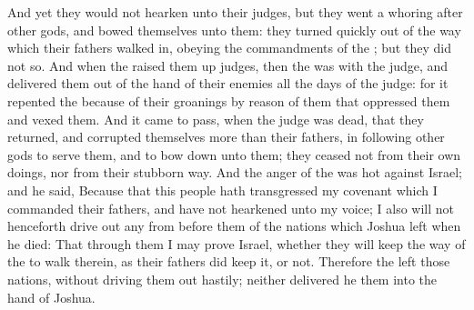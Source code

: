 \begin{biblechapter}
\verse And yet they would not hearken unto their judges, but they went a whoring after other gods, and bowed themselves unto them: they turned quickly out of the way which their fathers walked in, obeying the commandments of the \LORD; but they did not so.
\verse And when the \LORD raised them up judges, then the \LORD was with the judge, and delivered them out of the hand of their enemies all the days of the judge: for it repented the \LORD because of their groanings by reason of them that oppressed them and vexed them.
\verse And it came to pass, when the judge was dead, that they returned, and corrupted themselves more than their fathers, in following other gods to serve them, and to bow down unto them; they ceased not from their own doings, nor from their stubborn way.
\verse And the anger of the \LORD was hot against Israel; and he said, Because that this people hath transgressed my covenant which I commanded their fathers, and have not hearkened unto my voice;
\verse I also will not henceforth drive out any from before them of the nations which Joshua left when he died:
\verse That through them I may prove Israel, whether they will keep the way of the \LORD to walk therein, as their fathers did keep it, or not.
\verse Therefore the \LORD left those nations, without driving them out hastily; neither delivered he them into the hand of Joshua.
\end{biblechapter}

